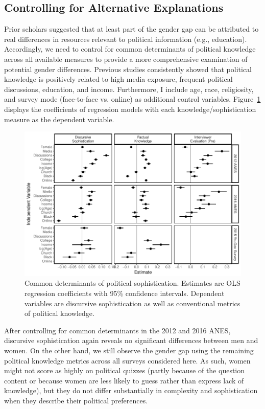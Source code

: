\documentclass[12pt]{article}
\begin{document}
\subsection*{Controlling for Alternative Explanations}

Prior scholars suggested that at least part of the gender gap can be attributed to real differences in resources relevant to political information (e.g., education). Accordingly, we need to control for common determinants of political knowledge across all available measures to provide a more comprehensive examination of potential gender differences. Previous studies consistently showed that political knowledge is positively related to high media exposure, frequent political discussions, education, and income. Furthermore, I include age, race, religiosity, and survey mode (face-to-face vs. online) as additional control variables. Figure~\ref{fig:determinants} displays the coefficients of regression models with each knowledge/sophistication measure as the dependent variable.

\begin{figure}[h]\centering
\includegraphics{../fig/determinants.pdf}
\caption{Common determinants of political sophistication. Estimates are OLS regression coefficients with 95\% confidence intervals. Dependent variables are discursive sophistication as well as conventional metrics of political knowledge.
}\label{fig:determinants}
\end{figure}

After controlling for common determinants in the 2012 and 2016 ANES, discursive sophistication again reveals no significant differences between men and women. On the other hand, we still observe the gender gap using the remaining political knowledge metrics across all surveys considered here. As such, women might not score as highly on political quizzes (partly because of the question content or because women are less likely to guess rather than express lack of knowledge), but they do not differ substantially in complexity and sophistication when they describe their political preferences.
\end{document}
